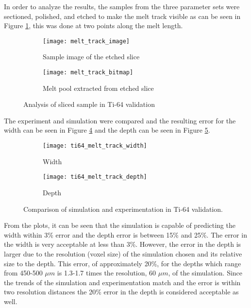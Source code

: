 In order to analyze the results, the samples from the three parameter sets were sectioned, polished, and etched to make the melt track visible as can be seen in Figure \ref{fig:melt_track_image}, this was done at two points along the melt length.  
\begin{figure}[!htb]
	\centering
		\begin{subfigure}{0.495\textwidth}
		\texttt{[image: melt\_track\_image]}
		\caption{Sample image of the etched slice}
		\label{fig:melt_track_image}
		\end{subfigure}
			\begin{subfigure}{0.495\textwidth}
			\texttt{[image: melt\_track\_bitmap]}
			\caption{Melt pool extracted from etched slice}
			\label{fig:melt_track_bitmap}
			\end{subfigure}
	\caption{Analysis of sliced sample in Ti-64 validation}
	\label{fig:melt_track}
\end{figure}
The experiment and simulation were compared and the resulting error for the width can be seen in Figure \ref{fig:ti64_melt_track_width} and the depth can be seen in Figure \ref{fig:ti64_melt_track_depth}.
\begin{figure}[!htb]\centering
	\begin{subfigure}[c]{0.45\textwidth}\centering
	\texttt{[image: ti64\_melt\_track\_width]}
	\caption{Width}
	\label{fig:ti64_melt_track_width}
	\end{subfigure}\hfill{}
		\begin{subfigure}[c]{0.45\textwidth}\centering
		\texttt{[image: ti64\_melt\_track\_depth]}
		\caption{Depth}
		\label{fig:ti64_melt_track_depth}
		\end{subfigure}
	\caption{Comparison of simulation and experimentation in Ti-64 validation.}
	\label{fig:ti64_melt_track}
\end{figure}
From the plots, it can be seen that the simulation is capable of predicting the width within 3\% error and the depth error is between 15\% and 25\%.  The error in the width is very acceptable at less than 3\%.
However, the error in the depth is larger due to the resolution (voxel size) of the simulation chosen and its relative size to the depth.  This error, of approximately 20\%, for the depths which range from 450-500 $\mu m$ is 1.3-1.7 times the resolution, 60 $\mu m$, of the simulation.  Since the trends of the simulation and experimentation match and the error is within two resolution distances the 20\% error in the depth is considered acceptable as well. 
